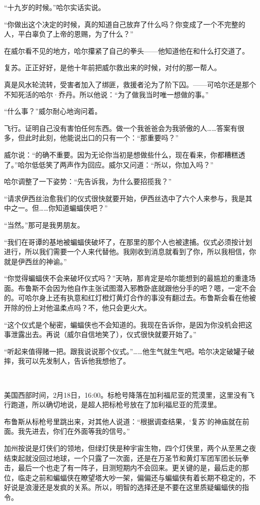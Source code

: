 \documentclass[../main]{subfiles}
\begin{document}
“十九岁的时候。”哈尔实话实说。

“你做出这个决定的时候，真的知道自己放弃了什么吗？你变成了一个不完整的人，平白辜负了上帝的恩赐，为了什么？”

在威尔看不见的地方，哈尔攥紧了自己的拳头——他知道他在和什么打交道了。

复苏。正正好好，是他十年前把威尔救出来的时候，对付的那一帮人。

真是风水轮流转，受害者加入了绑匪，救援者沦为了阶下囚。——可哈尔还是那个不知死活的哈尔·乔丹。所以他说：“为了做我当时唯一想做的事。”

“什么事？”威尔耐心地询问着。

飞行。证明自己没有害怕任何东西。做一个我爸爸会为我骄傲的人……答案有很多，但此时此刻，他能说出口的只有一个：“那重要吗？”

威尔说：“的确不重要。因为无论你当初是想做些什么，现在看来，你都糟糕透了。”哈尔低低笑了两声作为回应。威尔又问道：“所以，你加入吗？”

哈尔调整了一下姿势：“先告诉我，为什么要招揽我？”

“请求伊西丝治愈我们的仪式很快就要开始，伊西丝选中了六个人来参与，我是其中之一。但……你知道蝙蝠侠吧？”

“当然。”那可是我男朋友。

“我们在哥谭的基地被蝙蝠侠破坏了，在那里的那个人也被逮捕。仪式必须按计划进行，所以我们需要一个人来代替他。我刚收到消息就看到了你，所以我相信，你就是伊西丝的神谕。”

“你觉得蝙蝠侠不会来破坏仪式吗？”天呐，那肯定是哈尔能想到的最尴尬的重逢场面。布鲁斯不会因为他自作主张试图潜入邪教卧底就跟他分手的吧？嗯，一定不会的。可哈尔身上还有执意和红灯橙灯黄灯合作的事没有翻过去。布鲁斯会看在他被开除的份上对他温柔点吗？不，他只会更火大。

“这个仪式是个秘密，蝙蝠侠也不会知道的。我现在告诉你，是因为你没机会把这事泄露出去。再说（威尔自信地笑了），仪式很快就要开始了。”

“听起来值得赌一把。跟我说说那个仪式。”……他生气就生气吧。哈尔决定破罐子破摔，我可以先发制人，告诉他我想他了。

~\

美国西部时间，2月18日，16:00。标枪号降落在加利福尼亚的荒漠里，这里没有飞行跑道，所以确切地说，是超人把标枪号放在了加利福尼亚的荒漠里。

布鲁斯从标枪号里跳出来，对其他人说道：“根据调查结果，‘复苏’的神庙就在前面。我先进去，你们在外面等我的信号。”

加州按说是灯侠们的领地，但绿灯侠是种宇宙生物，四个灯侠里，两个从至黑之夜结束起就没回过地球，一个只露了一次面，还是在万圣节和黄灯军团军团长玩拳击，最后一个也走了有一阵子，目测短期内不会回来。更关键的是，最后走的那位，临走之前和蝙蝠侠在瞭望塔大吵一架，偏偏还与蝙蝠侠有着长期不稳定的，不好说是浪漫还是发疯的关系。所以，明智的选择还是不要在这里质疑蝙蝠侠的指令。
\end{document}
